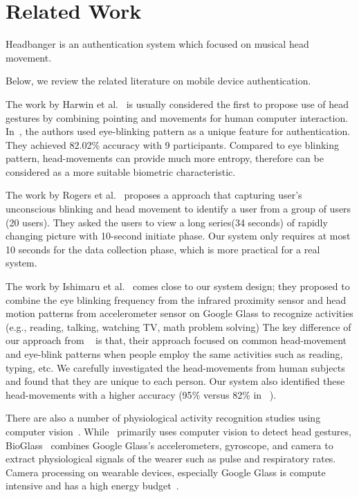 \section{Related Work}\label{sec:related}
Headbanger is an authentication system which focused on musical head movement. 

Below, we review the related literature on mobile device authentication.


The work by Harwin et al.~\cite{harwin1990analysis} is usually considered the 
first to propose use of head gestures by combining pointing and movements
for human computer interaction. 
In~\cite{westeyn2004recognizing}, the authors used 
eye-blinking pattern as a unique feature for
authentication. They achieved 82.02\% accuracy with 9 participants. Compared 
to eye blinking pattern, head-movements can provide much more entropy, 
therefore can be considered as a more suitable biometric characteristic.

The work by Rogers et al.~\cite{rogers2015approach} proposes a approach that capturing user's unconscious blinking and head movement to identify a user from a group of users (20 users). They asked the users to view a long series(34 seconds) of rapidly changing picture with 10-second initiate phase. Our system only requires at most 10 seconds for the  data collection phase, which is more practical for a real system. 
 
The work by Ishimaru et al.~\cite{ishimaru2014blink} comes close to our system 
design; they proposed to combine the eye blinking frequency from the infrared 
proximity sensor and head motion patterns from accelerometer sensor on Google 
Glass to recognize activities (e.g., reading, talking, watching TV,
math problem solving) 
The key difference of our approach from ~\cite{ishimaru2014blink} is 
that, their approach focused on common head-movement and eye-blink patterns 
when people employ the same activities such as reading, typing, etc. 
We carefully investigated the head-movements from human subjects and found 
that they are unique to each person. 
Our system also identified these head-movements with a higher accuracy (95$\%$ 
versus 82$\%$ in ~\cite{ishimaru2014blink}).

There are also a number of physiological activity recognition studies 
using computer vision~\cite{kjeldsen2001head,hernandezbioglass}. 
While~\cite{kjeldsen2001head} primarily uses computer vision to detect 
head gestures, BioGlass~\cite{hernandezbioglass}
combines Google Glass's accelerometers, gyroscope, and camera to
extract physiological signals of the wearer such as pulse
and respiratory rates. Camera processing on wearable devices, especially 
Google Glass is compute intensive and has a high energy 
budget~\cite{likamwa2014draining}.

